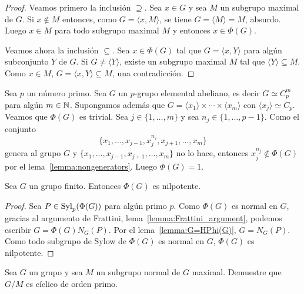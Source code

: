 \begin{proof}
	Veamos primero la inclusión $\supseteq$.  Sea $x\in G$ y sea $M$ un
	subgrupo maximal de $G$.  Si $x\not\in M$ entonces, como $G=\langle
	x,M\rangle$, se tiene $G=\langle M\rangle=M$, absurdo. Luego $x\in M$ para
	todo subgrupo maximal $M$ y entonces $x\in \Phi(G)$. 

	Veamos ahora la inclusión $\subseteq$. Sea $x\in\Phi(G)$ tal que $G=\langle
	x,Y\rangle$ para algún subconjunto $Y$ de $G$. Si $G\ne \langle Y\rangle$,
	existe un subgrupo maximal $M$ tal que $\langle Y\rangle\subseteq M$. Como
	$x\in M$, $G=\langle x,Y\rangle\subseteq M$, una contradicción.
\end{proof}

\begin{example}
	Sea $p$ un número primo. Sea $G$ un $p$-grupo elemental abeliano, es decir
	$G\simeq C_p^m$ para algún $m\in\mathbb{N}$.  Supongamos además que
	$G=\langle x_1\rangle\times\cdots\times\langle x_m\rangle$ con $\langle x_j\rangle\simeq C_p$.  
	Veamos que $\Phi(G)$ es trivial. 
	Sea $j\in\{1,\dots,m\}$ y sea $n_j\in\{1,\dots,p-1\}$. Como el conjunto
	\[
	\{x_1,\dots,x_{j-1},x_j^{n_j},x_{j+1},\dots,x_m\}
	\]
	genera al grupo $G$ y $\{x_1,\dots,x_{j-1},x_{j+1},\dots,x_m\}$ no lo hace,
	entonces $x_j^{n_j}\not\in\Phi(G)$ por el lema~\ref{lemma:nongenerators}.
	Luego $\Phi(G)=1$.
\end{example}

\begin{theorem}[Frattini]
	\label{theorem:Frattini}
	Sea $G$ un grupo finito. Entonces $\Phi(G)$ es nilpotente.
\end{theorem}

\begin{proof}
	Sea $P\in\mathrm{Syl}_p(\Phi(G))$ para algún primo $p$. Como $\Phi(G)$ es normal en
	$G$, gracias al argumento de Frattini, lema~\ref{lemma:Frattini_argument},
	podemos escribir $G=\Phi(G)N_G(P)$. Por el lema~\ref{lemma:G=HPhi(G)},
	$G=N_G(P)$. Como todo subgrupo de Sylow de $\Phi(G)$ es normal en $G$,
	$\Phi(G)$ es nilpotente.
\end{proof}

\begin{exercise}
	\label{exercise:G/M}
	Sea $G$ un grupo y sea $M$ un subgrupo normal de $G$ maximal. Demuestre que
	$G/M$ es cíclico de orden primo. 
\end{exercise}


